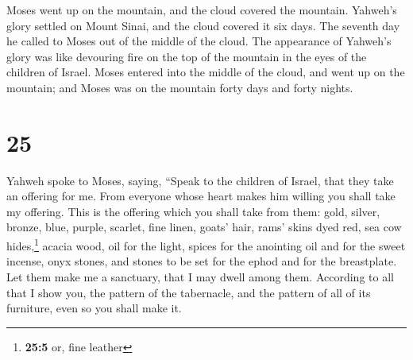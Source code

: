  Moses went up on the mountain, and the cloud covered the
mountain.  Yahweh's glory settled on Mount Sinai, and the
cloud covered it six days. The seventh day he called to Moses out of the
middle of the cloud.  The appearance of Yahweh's glory
was like devouring fire on the top of the mountain in the eyes of the
children of Israel.  Moses entered into the middle of the
cloud, and went up on the mountain; and Moses was on the mountain forty
days and forty nights.

\hypertarget{section-24}{%
\section{25}\label{section-24}}

 Yahweh spoke to Moses, saying,  ``Speak to
the children of Israel, that they take an offering for me. From everyone
whose heart makes him willing you shall take my offering. 
This is the offering which you shall take from them: gold, silver,
bronze,  blue, purple, scarlet, fine linen, goats' hair,
 rams' skins dyed red, sea cow hides,\footnote{\textbf{25:5}
  or, fine leather} acacia wood,  oil for the light,
spices for the anointing oil and for the sweet incense, 
onyx stones, and stones to be set for the ephod and for the breastplate.
 Let them make me a sanctuary, that I may dwell among
them.  According to all that I show you, the pattern of
the tabernacle, and the pattern of all of its furniture, even so you
shall make it.

